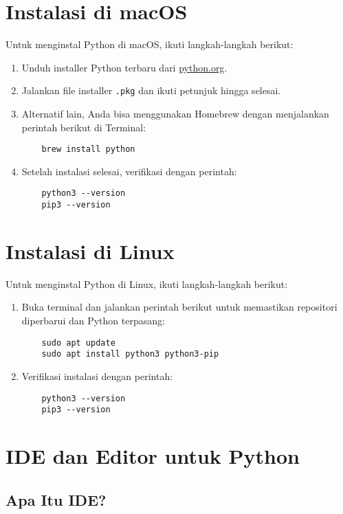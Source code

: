 \section{Instalasi di macOS}

Untuk menginstal Python di macOS, ikuti langkah-langkah berikut:

\begin{enumerate}
\item Unduh installer Python terbaru dari \href{https://www.python.org/downloads/macos/}{python.org}.
\item Jalankan file installer \texttt{.pkg} dan ikuti petunjuk hingga selesai.
\item Alternatif lain, Anda bisa menggunakan Homebrew dengan menjalankan perintah berikut di Terminal:
\begin{verbatim}
    brew install python
\end{verbatim}
\item Setelah instalasi selesai, verifikasi dengan perintah:
\begin{verbatim}
    python3 --version
    pip3 --version
\end{verbatim}
\end{enumerate}

\section{Instalasi di Linux}

Untuk menginstal Python di Linux, ikuti langkah-langkah berikut:

\begin{enumerate}
\item Buka terminal dan jalankan perintah berikut untuk memastikan repositori diperbarui dan Python terpasang:
\begin{verbatim}
    sudo apt update
    sudo apt install python3 python3-pip
\end{verbatim}
\item Verifikasi instalasi dengan perintah:
\begin{verbatim}
    python3 --version
    pip3 --version
\end{verbatim}
\end{enumerate}

\section{IDE dan Editor untuk Python}

\subsection{Apa Itu IDE?}

